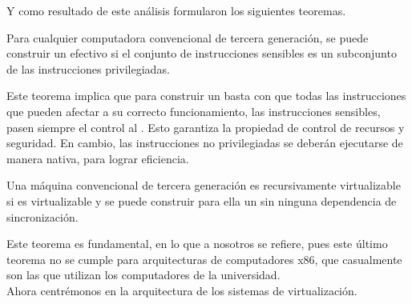 Y como resultado de este análisis formularon los siguientes teoremas.
\begin{teorema}
Para cualquier computadora convencional de tercera generación, se puede construir un  efectivo si el conjunto de instrucciones sensibles es un subconjunto de las instrucciones privilegiadas.
\end{teorema}

Este teorema implica que para construir un  basta con que todas las instrucciones que pueden afectar a su correcto funcionamiento, las instrucciones sensibles, pasen siempre el control al . Esto garantiza la propiedad de control de recursos y seguridad. En cambio, las instrucciones no privilegiadas se deberán ejecutarse de manera nativa, para lograr eficiencia.

\begin{teorema}
Una máquina convencional de tercera generación es recursivamente virtualizable si es virtualizable y se puede construir para ella un  sin ninguna dependencia de sincronización.
\end{teorema}

Este teorema es fundamental, en lo que a nosotros se refiere, pues este último teorema no se cumple para arquitecturas de computadores x86, que casualmente son las que utilizan los computadores de la universidad.\\

Ahora centrémonos en la arquitectura de los sistemas de virtualización.